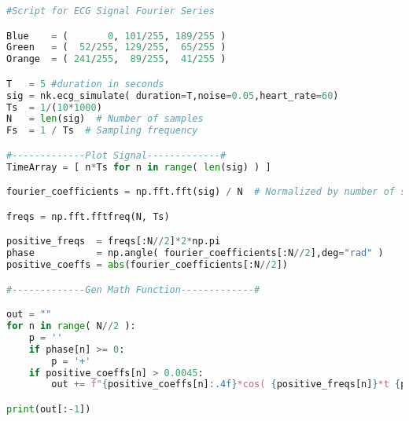 \begin{lstlisting}[language=python, caption=EcfFourierCoefs.py]
#Script for ECG Signal Fourier Series 

Blue    = (       0, 101/255, 189/255 )
Green   = (  52/255, 129/255,  65/255 )
Orange  = ( 241/255,  89/255,  41/255 )

T   = 5 #duration in seconds
sig = nk.ecg_simulate( duration=T,noise=0.05,heart_rate=60)
Ts  = 1/(10*1000)
N   = len(sig)  # Number of samples
Fs  = 1 / Ts  # Sampling frequency

#-------------Plot Signal-------------#
TimeArray = [ n*Ts for n in range( len(sig) ) ]

fourier_coefficients = np.fft.fft(sig) / N  # Normalized by number of samples

freqs = np.fft.fftfreq(N, Ts)

positive_freqs  = freqs[:N//2]*2*np.pi
phase           = np.angle( fourier_coefficients[:N//2],deg="rad" )
positive_coeffs = abs(fourier_coefficients[:N//2])

#-------------Gen Math Function-------------#

out = ""
for n in range( N//2 ):
    p = ''
    if phase[n] >= 0:
        p = '+'
    if positive_coeffs[n] > 0.0045:
        out += f"{positive_coeffs[n]:.4f}*cos( {positive_freqs[n]}*t {p} {phase[n]:.4f} )+"

print(out[:-1])
\end{lstlisting}
